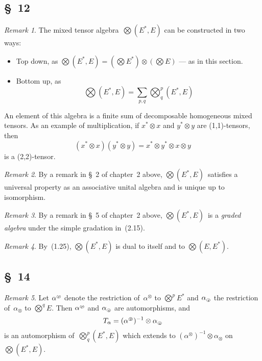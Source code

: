 \documentclass[letterpaper,12pt]{article}
\newcommand{\tprod}{\otimes}
\newcommand{\bigtprod}{\bigotimes}
\newcommand{\medtprod}{{\textstyle\bigtprod}}
\newcommand{\circled}[1]{\text{\tiny\textcircled{\textit{#1}}}}
\theoremstyle{definition}
\theoremstyle{remark}
\newtheorem*{rmk}{Remark}
\begin{document}
\subsection*{\S~12}
\begin{rmk}
The mixed tensor algebra~\(\medtprod(E^*,E)\) can be constructed in two ways:
\begin{itemize}
\item Top down, as \(\medtprod(E^*,E)=(\medtprod E^*)\tprod(\medtprod E)\) --- as in this section.
\item Bottom up, as
\[\medtprod(E^*,E)=\sum_{p,q}\medtprod^p_q(E^*,E)\]
\end{itemize}
An element of this algebra is a finite sum of decomposable homogeneous mixed tensors. As an example of multiplication, if \(x^*\tprod x\) and \(y^*\tprod y\) are (1,1)-tensors, then
\[(x^*\tprod x)(y^*\tprod y)=x^*\tprod y^*\tprod x\tprod y\]
is a (2,2)-tensor.
\end{rmk}

\begin{rmk}
By a remark in \S~2 of chapter~2 above, \(\medtprod(E^*,E)\)~satisfies a universal property as an associative unital algebra and is unique up to isomorphism.
\end{rmk}

\begin{rmk}
By a remark in \S~5 of chapter~2 above, \(\medtprod(E^*,E)\)~is a \emph{graded algebra} under the simple gradation in~(2.15).
\end{rmk}

\begin{rmk}
By~(1.25), \(\medtprod(E^*,E)\) is dual to itself and to \(\medtprod(E,E^*)\).
\end{rmk}

\subsection*{\S~14}
\begin{rmk}
Let \(\alpha^{\circled{p}}\) denote the restriction of~\(\alpha^{\tprod}\) to \(\medtprod^p E^*\) and \(\alpha_{\circled{q}}\) the restriction of~\(\alpha_{\tprod}\) to \(\medtprod^q E\). Then \(\alpha^{\circled{p}}\) and \(\alpha_{\circled{q}}\) are automorphisms, and
\[T_{\alpha}=(\alpha^{\circled{p}})^{-1}\tprod\alpha_{\circled{q}}\]
is an automorphism of~\(\medtprod^p_q(E^*,E)\) which extends to \((\alpha^{\tprod})^{-1}\tprod\alpha_{\tprod}\) on~\(\medtprod(E^*,E)\).
\end{rmk}
\end{document}
